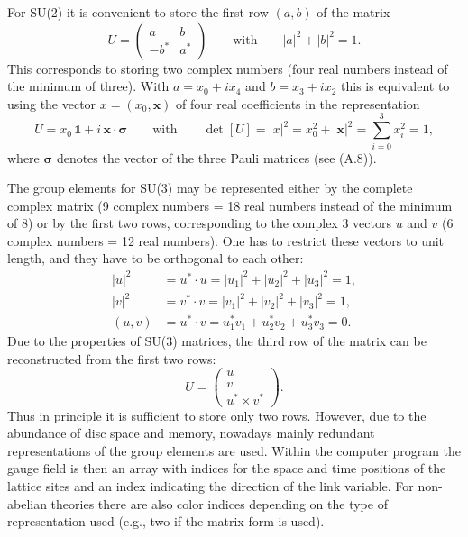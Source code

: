 For SU(2) it is convenient to store the first row $(a,b)$ of the matrix
\begin{equation}
  U = \begin{pmatrix} a & b \\ -b^* & a^* \end{pmatrix}
  \qquad\text{with}\qquad
  |a|^2 + |b|^2 = 1 .
\end{equation}
This corresponds to storing two complex numbers (four real numbers instead
of the minimum of three). With $a = x_0 + i x_4$ and $b = x_3 + i x_2$ this is equivalent
to using the vector $x = (x_0, \mathbf{x})$ of four real coefficients in the representation
\begin{equation}
  U = x_0\,\mathbb{1} + i\,\mathbf{x}\cdot\boldsymbol{\sigma}
  \qquad\text{with}\qquad
  \det[U] = |x|^2 = x_0^2 + |\mathbf{x}|^2 = \sum_{i=0}^{3}x_i^2 = 1,
\end{equation}
where $\boldsymbol{\sigma}$ denotes the vector of the three Pauli matrices (see (A.8)).

The group elements for SU(3) may be represented either by the complete
complex matrix (9 complex numbers = 18 real numbers instead of the minimum of 8) or by the first two rows, corresponding to the complex 3 vectors
$u$ and $v$ (6 complex numbers = 12 real numbers). One has to restrict these
vectors to unit length, and they have to be orthogonal to each other:
\begin{equation}
  \begin{split}
    |u|^2 &= u^*\cdot u = |u_1|^2 + |u_2|^2 + |u_3|^2 = 1, \\
    |v|^2 &= v^*\cdot v = |v_1|^2 + |v_2|^2 + |v_3|^2 = 1, \\
    (u,v) &= u^*\cdot v = u_1^*v_1 + u_2^*v_2 + u_3^*v_3 = 0 .
  \end{split}
\end{equation}
Due to the properties of SU(3) matrices, the third row of the matrix can be
reconstructed from the first two rows:
\begin{equation}
  U = \begin{pmatrix} u \\ v \\ u^* \times v^* \end{pmatrix}.
\end{equation}
Thus in principle it is sufficient to store only two rows. However, due to the
abundance of disc space and memory, nowadays mainly redundant representations of the group elements are used. Within the computer program the
gauge field is then an array with indices for the space and time positions of
the lattice sites and an index indicating the direction of the link variable.
For non-abelian theories there are also color indices depending on the type of
representation used (e.g., two if the matrix form is used).

